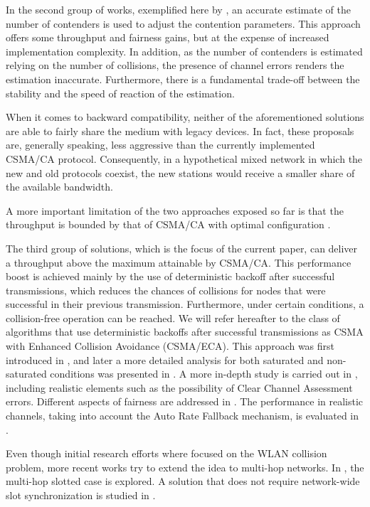 \documentclass[conference]{IEEEtran}
\begin{document}
In the second group of works, exemplified here by \cite{cali2000dti,lopez-toledo2006aoi}, an accurate estimate of the number of contenders is used to adjust the contention parameters. This approach offers some throughput and fairness gains, but at the expense of increased implementation complexity. In addition, as the number of contenders is estimated relying on the number of collisions, the presence of channel errors renders the estimation inaccurate.
Furthermore, there is a fundamental trade-off between the stability and the speed of reaction of the estimation.

When it comes to backward compatibility, neither of the aforementioned solutions are able to fairly share the medium with legacy devices.
In fact, these proposals are, generally speaking, less aggressive than the currently implemented CSMA/CA protocol. Consequently, in a hypothetical mixed network in which the new and old protocols coexist, the new stations would receive a smaller share of the available bandwidth.

A more important limitation of the two approaches exposed so far is that the throughput is bounded by that of CSMA/CA with optimal configuration \cite{cali2000dti,bianchi2000pai}.

The third group of solutions, which is the focus of the current paper, can deliver a throughput above the maximum attainable by CSMA/CA. This performance boost is achieved mainly by the use of deterministic backoff after successful transmissions, which reduces the chances of collisions for nodes that were successful in their previous transmission. Furthermore, under certain conditions, a collision-free operation can be reached. {We will refer hereafter to the class of algorithms that use deterministic backoffs after successful transmissions as CSMA with Enhanced Collision Avoidance (CSMA/ECA).} This approach was first introduced in \cite{barcelo2008lba}, and later a more detailed analysis for both saturated and non-saturated conditions was presented in \cite{bellalta2009vtc}.
A more in-depth study is carried out in \cite{he2009srb}, including realistic elements such as the possibility of Clear Channel Assessment errors.
Different aspects of fairness are addressed in \cite{he2009srb,barcelo2010fcc,fang2011dlm}.
The performance in realistic channels, taking into account the Auto Rate Fallback mechanism, is evaluated in \cite{martorell2012pec,martorell2012tfl}.

Even though initial research efforts where focused on the WLAN collision problem, more recent works try to extend the idea to multi-hop networks.
In \cite{hui2011epp}, the multi-hop slotted case is explored.
A solution that does not require network-wide slot synchronization is studied in  \cite{barcelo2013dcc}.
\end{document}
